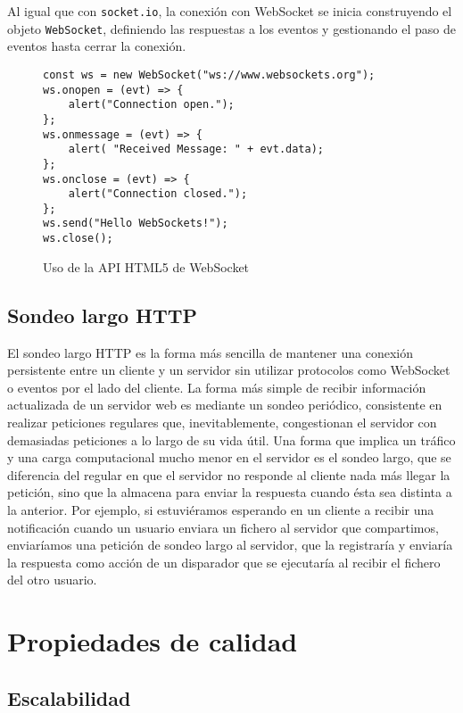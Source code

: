 \documentclass[runningheads]{llncs}
\begin{document}
Al igual que con \texttt{socket.io}, la conexión con WebSocket se inicia construyendo el objeto \texttt{WebSocket}, definiendo las respuestas a los eventos y gestionando el paso de eventos hasta cerrar la conexión.

\begin{figure}[!ht]
\begin{lstlisting}
const ws = new WebSocket("ws://www.websockets.org");
ws.onopen = (evt) => {
	alert("Connection open.");
};
ws.onmessage = (evt) => {
	alert( "Received Message: " + evt.data);
};
ws.onclose = (evt) => {
	alert("Connection closed.");
};
ws.send("Hello WebSockets!");
ws.close();
\end{lstlisting}
\caption{Uso de la API HTML5 de WebSocket\cite{html5-websocket}}
\end{figure}

\subsection{Sondeo largo HTTP}

El sondeo largo HTTP es la forma más sencilla de mantener una conexión persistente entre un cliente y un servidor sin utilizar protocolos como WebSocket o eventos por el lado del cliente\cite{jsinfo-polling}.
La forma más simple de recibir información actualizada de un servidor web es mediante un sondeo periódico, consistente en realizar peticiones regulares que, inevitablemente, congestionan el servidor con demasiadas peticiones a lo largo de su vida útil.
Una forma que implica un tráfico y una carga computacional mucho menor en el servidor es el sondeo largo, que se diferencia del regular en que el servidor no responde al cliente nada más llegar la petición, sino que la almacena para enviar la respuesta cuando ésta sea distinta a la anterior.
Por ejemplo, si estuviéramos esperando en un cliente a recibir una notificación cuando un usuario enviara un fichero al servidor que compartimos, enviaríamos una petición de sondeo largo al servidor, que la registraría y enviaría la respuesta como acción de un disparador que se ejecutaría al recibir el fichero del otro usuario.

\section{Propiedades de calidad}

\subsection{Escalabilidad}
\end{document}
